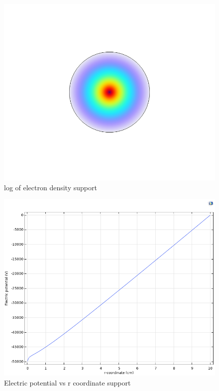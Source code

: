 \begin{figure}[p]
	\centering
	\includegraphics[scale=0.4]{images/results images/Comsol images/log of electron density.png}
	\caption{log of electron density
	support}
\end{figure}

\begin{figure}[p]
	\centering
	\includegraphics[scale=0.25]{images/results images/Comsol images/Electric potential.png}
	\caption{Electric potential vs r coordinate
	support}
\end{figure}

